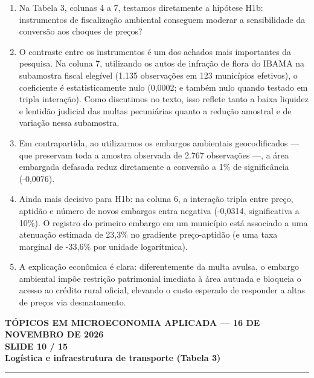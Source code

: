 \documentclass[11pt,a4paper]{article}
\newcommand{\slidenum}{1}
\begin{document}
\vspace{0.8mm}
\begin{enumerate}[leftmargin=*,label=\textbf{(\arabic*)},itemsep=2.8mm,topsep=1mm]
    \item Na Tabela 3, colunas 4 a 7, testamos diretamente a hipótese H1b: instrumentos de fiscalização ambiental conseguem moderar a sensibilidade da conversão aos choques de preços?
    \item O contraste entre os instrumentos é um dos achados mais importantes da pesquisa. Na coluna 7, utilizando os autos de infração de flora do IBAMA na subamostra fiscal elegível (1.135 observações em 123 municípios efetivos), o coeficiente é estatisticamente nulo (0,0002; e também nulo quando testado em tripla interação). Como discutimos no texto, isso reflete tanto a baixa liquidez e lentidão judicial das multas pecuniárias quanto a redução amostral e de variação nessa subamostra.
    \item Em contrapartida, ao utilizarmos os embargos ambientais geocodificados — que preservam toda a amostra observada de 2.767 observações —, a área embargada defasada reduz diretamente a conversão a 1\% de significância (-0,0076).
    \item Ainda mais decisivo para H1b: na coluna 6, a interação tripla entre preço, aptidão e número de novos embargos entra negativa (-0,0314, significativa a 10\%). O registro do primeiro embargo em um município está associado a uma atenuação estimada de 23,3\% no gradiente preço-aptidão (e uma taxa marginal de -33,6\% por unidade logarítmica).
    \item A explicação econômica é clara: diferentemente da multa avulsa, o embargo ambiental impõe restrição patrimonial imediata à área autuada e bloqueia o acesso ao crédito rural oficial, elevando o custo esperado de responder a altas de preços via desmatamento.
\end{enumerate}

\newpage

\renewcommand{\slidenum}{10}
\noindent
\begin{minipage}{\textwidth}
\begin{center}
{\color{cinza}\footnotesize\textbf{TÓPICOS EM MICROECONOMIA APLICADA --- 16 DE NOVEMBRO DE 2026}\\[1.2mm]}
{\color{cinza}\bfseries\Large SLIDE 10 / 15\\[1.5mm]}
{\color{verde}\bfseries\LARGE Logística e infraestrutura de transporte (Tabela 3)\\[2.5mm]}
\rule{\textwidth}{1pt}
\end{center}
\end{minipage}
\vspace{1.5mm}
\end{document}
